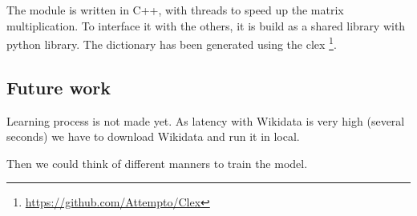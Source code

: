 The module is written in C++, with threads to speed up the matrix multiplication. To interface it with the others, it is build as a shared library with python library. The dictionary has been generated using the clex \footnote{\url{https://github.com/Attempto/Clex}}. 

\subsection{Future work}

Learning process is not made yet. As latency with Wikidata is very high (several seconds) we have to download Wikidata and run it in local.

Then we could think of different manners to train the model.


